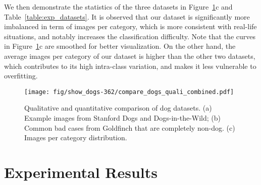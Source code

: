 \documentclass[runningheads]{llncs}
\begin{document}
We then demonstrate the statistics of the three datasets in Figure~\ref{fig:compare_dogs}c and Table~\ref{table:exp_datasets}.
It is observed that our dataset is significantly more imbalanced in term of images per category, which is more consistent with real-life situations, and notably increases the classification difficulty. Note that the curves in Figure~\ref{fig:compare_dogs}c are smoothed for better visualization.
On the other hand, the average images per category of our dataset is higher than the other two datasets, which contributes to its high intra-class variation, and makes it less vulnerable to overfitting.

\begin{table}[t]
   \small
    \begin{center}
  \end{center}
  \vspace{-.1in}
  \caption{Statistics of the related datasets.}
  \label{table:exp_datasets}
\end{table}

\begin{figure}[t]
  \centering
  \texttt{[image: fig/show\_dogs-362/compare\_dogs\_quali\_combined.pdf]}
  \caption{Qualitative and quantitative comparison of dog datasets. (a) Example images from Stanford Dogs and Dogs-in-the-Wild; (b) Common bad cases from Goldfinch that are completely non-dog. (c) Images per category distribution.}
  \label{fig:compare_dogs}
  \centering
\end{figure}

\section{Experimental Results}
\label{experimental_results}
\end{document}
